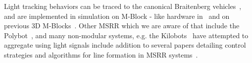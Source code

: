 Light tracking behaviors can be traced to the canonical Braitenberg vehicles~\cite{braitenberg1986vehicles}, and are implemented in simulation on M-Block - like hardware in~\cite{sclaicithesis2016} and on previous 3D M-Blocks~\cite{claici2017distributed}. Other MSRR which we are aware of that include the Polybot~\cite{Yim-IROS07}, and many non-modular systems, e.g. the Kilobots~\cite{Rubenstein-ICRA12} have attempted to aggregate using light signals include addition to several papers detailing control strategies and algorithms for line formation in MSRR systems~\cite{claici2017distributed, sclaicithesis2016}.


%
